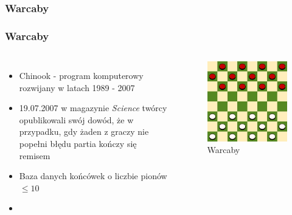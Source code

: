 \documentclass[polish,envcountsect,10pt]{beamer}
\begin{document}
            \subsubsection{Warcaby}
                \begin{frame}
                    \frametitle{Warcaby}
                    \begin{columns}
                        \begin{itemize}
                            \item<1-> Chinook - program komputerowy rozwijany w latach 1989 - 2007
                            \item<2-> 19.07.2007 w magazynie \textit{Science} twórcy opublikowali swój dowód, że w przypadku, gdy żaden z graczy nie popełni błędu partia kończy się remisem
                            \item<3-> Baza danych końcówek o liczbie pionów $\leq 10$
                            \item<4-> 
                        \end{itemize}
                        \begin{figure}[H]
                            \centering
                            \includegraphics[width=\textwidth]{images/checkers}
                            \caption{Warcaby}
                        \end{figure}
                    \end{columns}
                \end{frame}
\end{document}
